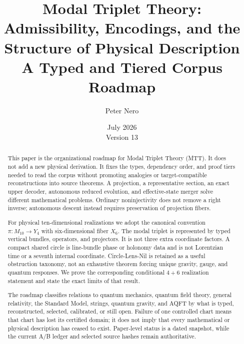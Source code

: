 \documentclass[11pt]{article}
\title{Modal Triplet Theory:\\
Admissibility, Encodings, and the Structure of Physical Description\\
\large A Typed and Tiered Corpus Roadmap}
\author{Peter Nero}
\date{July 2026\\Version 13}
\begin{document}
\maketitle

\begin{abstract}
This paper is the organizational roadmap for Modal Triplet Theory (MTT).  It
does not add a new physical derivation.  It fixes the types, dependency order,
and proof tiers needed to read the corpus without promoting analogies or
target-compatible reconstructions into source theorems.  A projection, a
representative section, an exact upper decoder, autonomous reduced evolution,
and effective-state merger solve different mathematical problems.  Ordinary
noninjectivity does not remove a right inverse; autonomous descent instead
requires preservation of projection fibers.

For physical ten-dimensional realizations we adopt the canonical convention
$\pi:M_{10}\to Y_4$ with six-dimensional fiber $X_6$.  The modal triplet is
represented by typed vertical bundles, operators, and projectors.  It is not
three extra coordinate factors.  A compact shared circle is line-bundle phase
or holonomy data and is not Lorentzian time or a seventh internal coordinate.
Circle-Lens-Nil is retained as a useful obstruction taxonomy, not an
exhaustive theorem forcing unique gravity, gauge, and quantum responses.  We
prove the corresponding conditional $4+6$ realization statement and state
the exact limits of that result.

The roadmap classifies relations to quantum mechanics, quantum field theory,
general relativity, the Standard Model, strings, quantum gravity, and AQFT by
what is typed, reconstructed, selected, calibrated, or still open.  Failure of
one controlled chart means that chart has lost its certified domain; it does
not imply that every mathematical or physical description has ceased to
exist.  Paper-level status is a dated snapshot, while the current A/B ledger
and selected source hashes remain authoritative.
\end{abstract}
\end{document}
